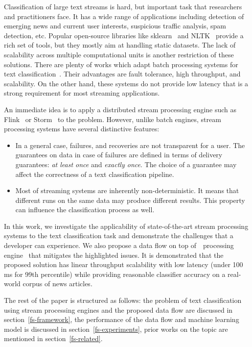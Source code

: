 \label {fs-short-intro}

Classification of large text streams is hard, but important task that researchers and practitioners face. It has a wide range of applications including detection of emerging news and current user interests, suspicious traffic analysis, spam detection, etc. Popular open-source libraries like sklearn~\cite{sklearn_api} and NLTK~\cite{bird2009natural} provide a rich set of tools, but they mostly aim at handling static datasets. The lack of scalability across multiple computational units is another restriction of these solutions. There are plenty of works which adapt batch processing systems for text classification~\cite{semberecki2016distributed, svyatkovskiy2016large, baltas2016apache, Nodarakis2016LargeSS}. Their advantages are fault tolerance, high throughput, and scalability. On the other hand, these systems do not provide low latency that is a strong requirement for most streaming applications.

An immediate idea is to apply a distributed stream processing engine such as Flink~\cite{Carbone:2017:SMA:3137765.3137777} or Storm~\cite{apache:storm} to the problem. However, unlike batch engines, stream processing systems have several distinctive features: 

\begin{itemize}
    \item In a general case, failures, and recoveries are not transparent for a user. The guarantees on data in case of failures are defined in terms of delivery guarantees: {\em at least once} and {\em exactly once}. The choice of a guarantee may affect the correctness of a text classification pipeline.
    \item Most of streaming systems are inherently non-deterministic. It means that different runs on the same data may produce different results. This property can influence the classification process as well.
\end{itemize}

In this work, we investigate the applicability of state-of-the-art stream processing systems to the text classification task and demonstrate the challenges that a developer can experience. We also propose a data flow on top of~\FlameStream\ processing engine~\cite{we2018beyondmr, we2018adbis} that mitigates the highlighted issues. It is demonstrated that the proposed solution has linear throughput scalability with low latency (under 100 ms for 99th percentile) while providing reasonable classifier accuracy on a real-world corpus of news articles.

The rest of the paper is structured as follows: the problem of text classification using stream processing engines and the proposed data flow are discussed in section~\ref{fs-framework}, the performance of the data flow and machine learning model is discussed in section~\ref{fs-experiments}, prior works on the topic are mentioned in section~\ref{fs-related}.
